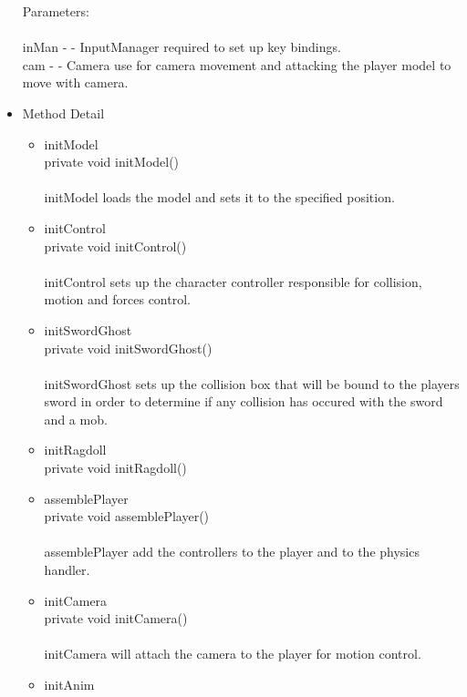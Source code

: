 \documentclass[letterpaper]{article}
\begin{document}
\begin{itemize}
										Parameters: \\ \\
										inMan - - InputManager required to set up key bindings. \\
										cam - - Camera use for camera movement and attacking the player model to move with camera. \\
								\item	Method Detail 
										\begin{itemize}
											\item	initModel \\
													private void initModel() \\ \\
													initModel loads the model and sets it to the specified position. \\
											\item	initControl \\
													private void initControl() \\ \\
													initControl sets up the character controller responsible for collision, motion and forces control.
											\item	initSwordGhost \\
													private void initSwordGhost() \\ \\
													initSwordGhost sets up the collision box that will be bound to the players sword in order to determine if any collision has occured with the sword and a mob.
											\item	initRagdoll \\
													private void initRagdoll() \\
											\item	assemblePlayer \\
													private void assemblePlayer() \\ \\
													assemblePlayer add the controllers to the player and to the physics handler. \\
											\item	initCamera \\
													private void initCamera() \\ \\
													initCamera will attach the camera to the player for motion control. \\
											\item	initAnim \\

\end{itemize}
\end{itemize}
\end{document}
